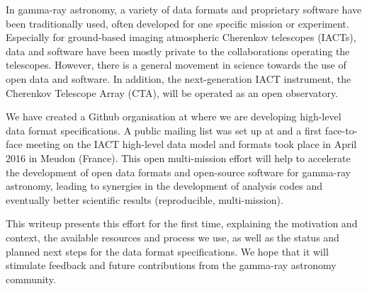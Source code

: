 In gamma-ray astronomy, a variety of data formats and proprietary software have been traditionally used, often developed for one specific mission or experiment. Especially for ground-based imaging atmospheric Cherenkov telescopes (IACTs), data and software have been mostly private to the collaborations operating the telescopes. However, there is a general movement in science towards the use of open data and software. In addition, the next-generation IACT instrument, the Cherenkov Telescope Array (CTA), will be operated as an open observatory.

We have created a Github organisation at \ogragithub where we are developing high-level data format specifications. A public mailing list was set up at \ogralist and a first face-to-face meeting on the IACT high-level data model and formats took place in April 2016 in Meudon (France). This open multi-mission effort will help to accelerate the development of open data formats and open-source software for gamma-ray astronomy, leading to synergies in the development of analysis codes and eventually better scientific results (reproducible, multi-mission).

This writeup presents this effort for the first time, explaining the motivation and context, the available resources and process we use, as well as the status and planned next steps for the data format specifications. We hope that it will stimulate feedback and future contributions from the gamma-ray astronomy community.
